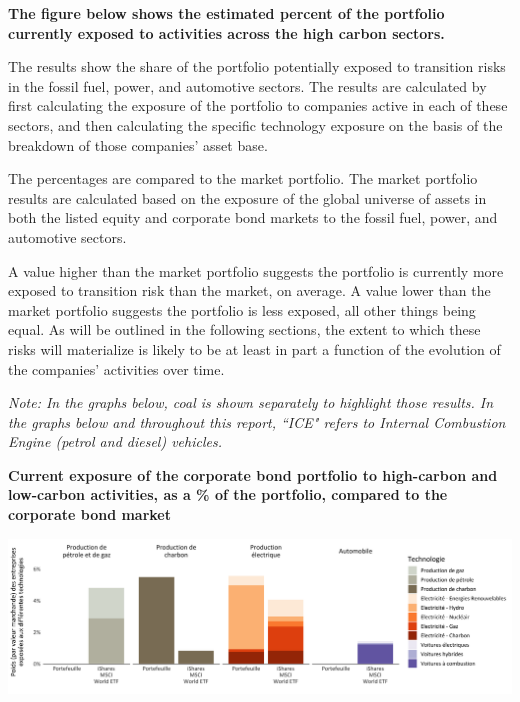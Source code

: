 \documentclass[10pt,table,a4]{article}\usepackage[]{graphicx}\usepackage[]{color}
\begin{document}
	\begin{multicols}{2}
		
		\textbf{The figure below shows the estimated percent of the portfolio currently exposed to activities across the high carbon sectors.}
		
		The results show the share of the portfolio potentially exposed to transition risks in the fossil fuel, power, and automotive sectors. The results are calculated by first calculating the exposure of the portfolio to companies active in each of these sectors, and then calculating the specific technology exposure on the basis of the breakdown of those companies' asset base. 
		
		The percentages are compared to the market portfolio. The market portfolio results are calculated based on the exposure of the global universe of assets in both the listed equity and corporate bond markets to the fossil fuel, power, and automotive sectors. \vfill\null \columnbreak
		
		A value higher than the market portfolio suggests the portfolio is currently more exposed to transition risk than the market, on average. A value lower than the market portfolio suggests the portfolio is less exposed, all other things being equal. As will be outlined in the following sections, the extent to which these risks will materialize is likely to be at least in part a function of the evolution of the companies' activities over time. 
		
		\textit{Note: In the graphs below, coal is shown separately to highlight those results. In the graphs below and throughout this report, ``ICE" refers to Internal Combustion Engine (petrol and diesel) vehicles.}
		
	\end{multicols}

	\vspace{-16pt}
	
	\textbf{Current exposure of the corporate bond portfolio to high-carbon and low-carbon activities, as a \% of the portfolio, compared to the corporate bond market}	%
	
	\includegraphics[trim = {0 0cm 0 0cm},width=1\linewidth]{ReportOutputs/Fig04} %
	
\end{document}
